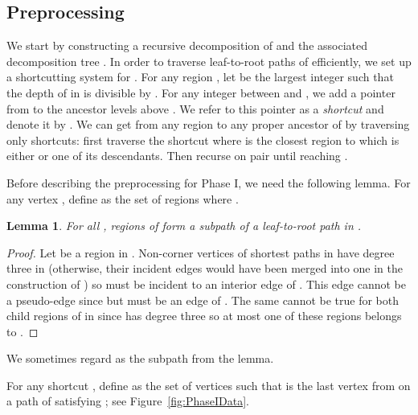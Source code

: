 \documentclass[11pt]{article}
\newtheorem{lemma}{Lemma}
\begin{document}
\subsection{Preprocessing}
We start by constructing a recursive decomposition of  and the associated decomposition tree . In order to traverse leaf-to-root paths of  efficiently, we set up a shortcutting system for . For any region , let  be the largest integer such that the depth of  in  is divisible by . For any integer  between  and , we add a pointer from  to the ancestor   levels above . We refer to this pointer as a \emph{shortcut} and denote it by . We can get from any region  to any proper ancestor  of  by traversing only  shortcuts: first traverse the shortcut  where  is the closest region to  which is either  or one of its descendants. Then recurse on pair  until reaching .



Before describing the preprocessing for Phase I, we need the following lemma. For any vertex , define  as the set of regions  where .
\begin{lemma}\label{Lem:RegionPath}
For all , regions of  form a subpath of a leaf-to-root path in .
\end{lemma}
\begin{proof}
Let  be a region in . Non-corner vertices of shortest paths in  have degree three in  (otherwise, their incident edges would have been merged into one in the construction of ) so  must be incident to an interior edge  of . This edge cannot be a pseudo-edge since  but must be an edge of . The same cannot be true for both child regions of  in  since  has degree three so at most one of these regions belongs to .
\end{proof}
We sometimes regard  as the subpath from the lemma.

For any shortcut , define  as the set of  vertices  such that  is the last vertex from  on a path of  satisfying ; see Figure~\ref{fig:PhaseIData}.
\end{document}
